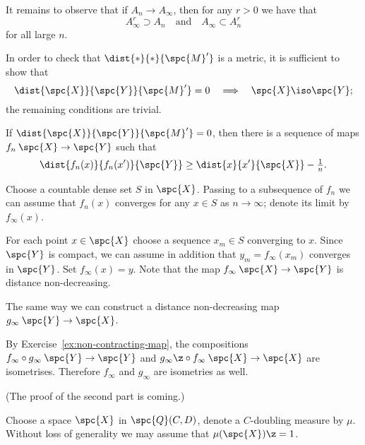 It remains to observe that if $A_n\to A_\infty$, then for any $r>0$ we have that
\[A_\infty^r\supset A_n
\quad\text{and}\quad
A_\infty\subset A_n^r\]
for all large $n$.

In order to check that $\dist{*}{*}{\spc{M}'}$ is a metric, it is sufficient to show that
\[\dist{\spc{X}}{\spc{Y}}{\spc{M}'}=0 
\quad\Longrightarrow\quad
\spc{X}\iso\spc{Y};\]
the remaining conditions are trivial.

If $\dist{\spc{X}}{\spc{Y}}{\spc{M}'}=0$, then there is a sequence of maps $f_n\:\spc{X}\to \spc{Y}$ such that 
\[\dist{f_n(x)}{f_n(x')}{\spc{Y}}\ge \dist{x}{x'}{\spc{X}}-\tfrac1n.\]

Choose a countable dense set $S$ in $\spc{X}$.
Passing to a subsequence of $f_n$ we can assume that $f_n(x)$ converges for any $x\in S$ as $n\to\infty$;
denote its limit by $f_\infty(x)$.

For each point $x\in\spc{X}$ choose a sequence $x_m\in S$ converging to $x$.
Since $\spc{Y}$ is compact, we can assume in addition that $y_m=f_\infty(x_m)$ converges in $\spc{Y}$.
Set $f_\infty(x)=y$.
Note that the map $f_\infty\:\spc{X}\to \spc{Y}$ is  distance non-decreasing.

The same way we can construct a distance non-decreasing map 
$g_\infty\:\spc{Y}\to \spc{X}$.

By Exercise~\ref{ex:non-contracting-map}, the compositions $f_\infty\circ g_\infty\:\spc{Y}\to \spc{Y}$ and $g_\infty\z\circ f_\infty\:\spc{X}\to \spc{X}$ are isometrises.
Therefore $f_\infty$ and $g_\infty$ are isometries as well.


(The proof of the second part is coming.) %

Choose a space $\spc{X}$ in $\spc{Q}(C,D)$, denote a $C$-doubling measure by $\mu$.
Without loss of generality we may assume that $\mu(\spc{X})\z=1$.

